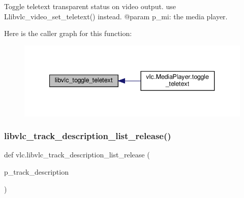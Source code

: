 \begin{DoxyVerb}Toggle teletext transparent status on video output.
\deprecated use L{libvlc_video_set_teletext}() instead.
@param p_mi: the media player.
\end{DoxyVerb}
 Here is the caller graph for this function\+:
\nopagebreak
\begin{figure}[H]
\begin{center}
\leavevmode
\includegraphics[width=340pt]{namespacevlc_a02d8dbdfe4e01b1399fb964450fa557e_icgraph}
\end{center}
\end{figure}
\mbox{\label{namespacevlc_a15a83a58b01dc7546ad799fffe743a93}} 
\subsubsection{\texorpdfstring{libvlc\+\_\+track\+\_\+description\+\_\+list\+\_\+release()}{libvlc\_track\_description\_list\_release()}}
{\footnotesize\ttfamily def vlc.\+libvlc\+\_\+track\+\_\+description\+\_\+list\+\_\+release (\begin{DoxyParamCaption}\item[{}]{p\+\_\+track\+\_\+description }\end{DoxyParamCaption})}

